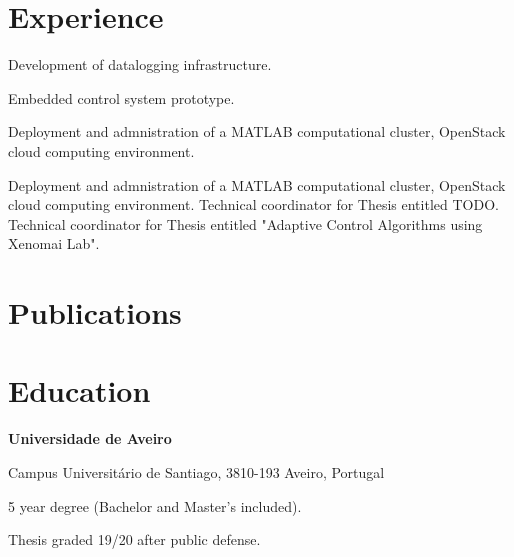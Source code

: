 \section*{Experience}

{
Development of datalogging infrastructure.

Embedded control system prototype.

Deployment and admnistration of a MATLAB computational cluster, OpenStack cloud
computing environment.
}

{
Deployment and admnistration of a MATLAB computational cluster, OpenStack cloud
computing environment.
}
{
Technical coordinator for Thesis entitled TODO.
}
{
Technical coordinator for Thesis entitled "Adaptive Control Algorithms using Xenomai Lab".
}

\section*{Publications}



\section*{Education}


{
\textbf{Universidade de Aveiro}

Campus Universitário de Santiago, 3810-193 Aveiro, Portugal
}


{
5 year degree (Bachelor and Master's included).

Thesis graded 19/20 after public defense. 
}


